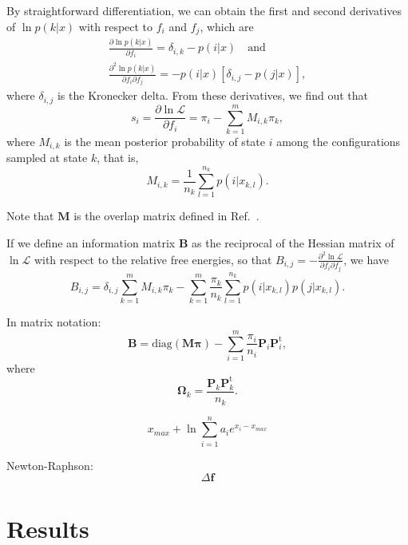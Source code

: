 \documentclass[aip,jcp,preprint,amsmath,amssymb]{revtex4-1}
\newcommand{\mt}[1]{\boldsymbol{\mathbf{#1}}}           %
\newcommand{\vt}[1]{\boldsymbol{\mathbf{#1}}}           %
\newcommand{\tr}[1]{#1^\text{t}}                        %
\begin{document}
By straightforward differentiation, we can obtain the first and second derivatives of $\ln p(k|x)$ with respect to $f_i$ and $f_j$, which are
\begin{gather*}
\frac{\partial \ln p(k|x)}{\partial f_i} = \delta_{i,k} - p(i|x) \quad \text{and} \\
\frac{\partial^2\ln p(k|x)}{\partial f_i \partial f_j} = -p(i|x)[\delta_{i,j} - p(j|x)],
\end{gather*}
where $\delta_{i,j}$ is the Kronecker delta. From these derivatives, we find out that
\begin{equation*}
s_i = \frac{\partial \ln \mathcal L}{\partial f_i} = \pi_i - \sum_{k=1}^m M_{i,k} \pi_k,
\end{equation*}
where $M_{i,k}$ is the mean posterior probability of state $i$ among the configurations sampled at state $k$, that is,
\begin{equation*}
M_{i,k} = \frac{1}{n_k} \sum_{l=1}^{n_k} p(i|x_{k,l}).
\end{equation*}

Note that $\mt M$ is the overlap matrix defined in Ref.~.

If we define an information matrix $\mt B$ as the reciprocal of the Hessian matrix of $\ln \mathcal L$ with respect to the relative free energies, so that $B_{i,j} = -\frac{\partial^2 \ln \mathcal L}{\partial f_i \partial f_j}$, we have
\begin{equation*}
B_{i,j} = \delta_{i,j} \sum_{k=1}^m M_{i,k} \pi_k - \sum_{k=1}^m \frac{\pi_k}{n_k} \sum_{l=1}^{n_k} p(i|x_{k,l})p(j|x_{k,l}).
\end{equation*}

In matrix notation:
\begin{equation*}
\mt B = \text{diag}(\mt M \vt \pi) - \sum_{i=1}^m \frac{\pi_i}{n_i} \mt P_i \tr{\mt P}_i,
\end{equation*}
where
\begin{equation*}
\mt \Omega_k = \frac{\mt P_k \tr{\mt P}_k}{n_k}.
\end{equation*}


\begin{equation}
x_{max} + \ln \sum_{i=1}^n a_i e^{x_i -x_{max}}
\end{equation}

Newton-Raphson:
\begin{equation*}
\Delta \vt f
\end{equation*}

\section{Results}
\end{document}
